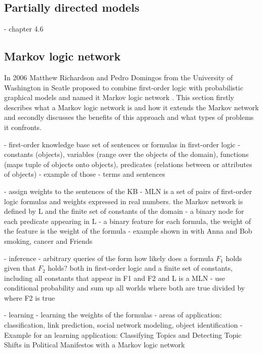 

\subsection{Partially directed models}
- chapter 4.6


\subsection{Markov logic network} \label{sec:mln}

In 2006 Matthew Richardson and Pedro Domingos from the University of Washington in Seatle proposed to combine first-order logic with probabilistic graphical models and named it Markov logic network \cite{richardson2006markov}. This section firstly describes what a Markov logic network is and how it extends the Markov network and secondly discusses the benefits of this approach and what types of problems it confronts.

- first-order knowledge base set of sentences or formulas in first-order logic
- constants (objects), variables (range over the objects of the domain), functions (maps tuple of objects onto objects), predicates (relations between or attributes of objects)
- example of those
- terms and sentences

- assign weights to the sentences of the KB
- MLN is a set of pairs of first-order logic formulas and weights expressed in real numbers. the Markov network is defined by L and the finite set of constants of the domain 
 - a binary node for each predicate appearing in L
 - a binary feature for each formula, the weight of the feature is the weight of the formula
- example shown in \cite{richardson2006markov} with Anna and Bob smoking, cancer and Friends %

- inference
 - arbitrary queries of the form how likely does a formula $F_1$ holds given that $F_2$ holds? both in first-order logic and a finite set of constants, including all constants that appear in F1 and F2 \cite{richardson2006markov} and L is a MLN
  - use conditional probability and sum up all worlds where both are true divided by where F2 is true
  
- learning
 - learning the weights of the formulas
 - areas of application: classification, link prediction, social network modeling, object identification
 - Example for an learning application: Classifying Topics and Detecting Topic Shifts in Political Manifestos with a Markov logic network \cite{zirn2016classifying}


